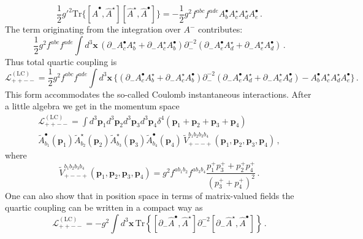 \documentclass[english,american]{article}
\begin{document}
\begin{equation}
\frac{1}{2}g'^{2}\mathrm{Tr}\Bigg\{\left[\hat{A}^{\bullet},\hat{A}^{\star}\right]\left[\hat{A}^{\star},\hat{A}^{\bullet}\right]\Bigg\}=-\frac{1}{2}g{}^{2}f^{abc}f^{ade}A_{b}^{\bullet}A_{c}^{\star}A_{d}^{\star}A_{e}^{\bullet}\,.
\end{equation}
The term originating from the integration over $A^{-}$ contributes:
\begin{equation}
\frac{1}{2}g^{2}f^{abc}f^{ade}\int d^{3}\mathbf{x}\,\left(\partial_{-}A_{c}^{\bullet}A_{b}^{\star}+\partial_{-}A_{c}^{\star}A_{b}^{\bullet}\right)\partial_{-}^{-2}\left(\partial_{-}A_{e}^{\bullet}A_{d}^{\star}+\partial_{-}A_{e}^{\star}A_{d}^{\bullet}\right)\,.
\end{equation}
Thus total quartic coupling is
\begin{equation}
\mathcal{L}_{++--}^{\left(\mathrm{LC}\right)}=\frac{1}{2}g{}^{2}f^{abc}f^{ade}\int d^{3}\mathbf{x}\,\Bigg\{\left(\partial_{-}A_{c}^{\bullet}A_{b}^{\star}+\partial_{-}A_{c}^{\star}A_{b}^{\bullet}\right)\partial_{-}^{-2}\left(\partial_{-}A_{e}^{\bullet}A_{d}^{\star}+\partial_{-}A_{e}^{\star}A_{d}^{\bullet}\right)-A_{b}^{\bullet}A_{c}^{\star}A_{d}^{\star}A_{e}^{\bullet}\Bigg\}\,.
\end{equation}
This form accommodates the so-called Coulomb instantaneous interactions.
After a little algebra we get in the momentum space
\begin{multline}
\mathcal{L}_{++--}^{\left(\mathrm{LC}\right)}=\int d^{3}\mathbf{p}_{1}d^{3}\mathbf{p}_{2}d^{3}\mathbf{p}_{3}d^{3}\mathbf{p}_{4}\delta^{4}\left(\mathbf{p}_{1}+\mathbf{p}_{2}+\mathbf{p}_{3}+\mathbf{p}_{4}\right)\\
\tilde{A}_{b_{1}}^{\bullet}\left(\mathbf{p}_{1}\right)\tilde{A}_{b_{2}}^{\star}\left(\mathbf{p}_{2}\right)\tilde{A}_{b_{3}}^{\star}\left(\mathbf{p}_{3}\right)\tilde{A}_{b_{4}}^{\bullet}\left(\mathbf{p}_{4}\right)\,\tilde{V}_{+--+}^{b_{1}b_{2}b_{3}b_{4}}\left(\mathbf{p}_{1},\mathbf{p}_{2},\mathbf{p}_{3},\mathbf{p}_{4}\right)\,,
\end{multline}
where
\begin{equation}
\tilde{V}_{+--+}^{b_{1}b_{2}b_{3}b_{4}}\left(\mathbf{p}_{1},\mathbf{p}_{2},\mathbf{p}_{3},\mathbf{p}_{4}\right)=g{}^{2}f^{ab_{1}b_{2}}f^{ab_{3}b_{4}}\frac{p_{1}^{+}p_{3}^{+}+p_{2}^{+}p_{4}^{+}}{\left(p_{3}^{+}+p_{4}^{+}\right)^{2}}\,.\label{eq:fourgluonvertex}
\end{equation}
One can also show that in position space in terms of matrix-valued
fields the quartic coupling can be written in a compact way as
\begin{equation}
\mathcal{L}_{++--}^{\left(\mathrm{LC}\right)}=-g^{2}\int d^{3}\mathbf{x}\,\mathrm{Tr}\left\{ \left[\partial_{-}\hat{A}^{\bullet},\hat{A}^{\star}\right]\partial_{-}^{-2}\left[\partial_{-}\hat{A}^{\star},\hat{A}^{\bullet}\right]\right\} \,.
\end{equation}
\end{document}
